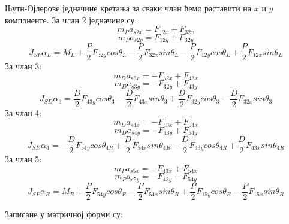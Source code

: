 \documentclass[12pt]{article}
\begin{document}
Њутн-Ојлерове једначине кретања за сваки члан ћемо раставити на $x$ и $y$ компоненте. За члан 2 једначине су:
\begin{equation}
    m_P a_{s2x} = F_{12x}+F_{32x}
\end{equation}
\begin{equation}
    m_P a_{s2y} = F_{12y}+F_{32y}
\end{equation}
\begin{equation}
    J_{SP} \alpha_L = M_L + \dfrac{P}{2}F_{32y}cos\theta_L - \dfrac{P}{2}F_{32x}sin\theta_L - \dfrac{P}{2}F_{12y}cos\theta_L + \dfrac{P}{2}F_{12x}sin\theta_L
\end{equation}
За члан 3:
\begin{equation}
    m_D a_{s3x} = -F_{32x}+F_{43x}
\end{equation}
\begin{equation}
    m_D a_{s3y} = -F_{32y}+F_{43y}
\end{equation}
\begin{equation}
    J_{SD} \alpha_3 = \dfrac{D}{2}F_{43y}cos\theta_3 - \dfrac{D}{2}F_{43x}sin\theta_3 + \dfrac{D}{2}F_{32y}cos\theta_3 - \dfrac{D}{2}F_{32x}sin\theta_3
\end{equation}
За члан 4:
\begin{equation}
    m_D a_{s4x} = -F_{43x}+F_{54x}
\end{equation}
\begin{equation}
    m_D a_{s4y} = -F_{43y}+F_{54y}
\end{equation}
\begin{equation}
    J_{SD} \alpha_4 = - \dfrac{D}{2}F_{54y}cos\theta_{4R} + \dfrac{D}{2}F_{54x}sin\theta_{4R} - \dfrac{D}{2}F_{43y}cos\theta_{4R} + \dfrac{D}{2}F_{43x}sin\theta_{4R}
\end{equation}
За члан 5:
\begin{equation}
    m_P a_{s5x} = -F_{43x}+F_{54x}
\end{equation}
\begin{equation}
    m_P a_{s5y} = -F_{43y}+F_{54y}
\end{equation}
\begin{equation}
    J_{SP} \alpha_R = M_R + \dfrac{P}{2}F_{54y}cos\theta_R - \dfrac{P}{2}F_{54x}sin\theta_R + \dfrac{P}{2}F_{15y}cos\theta_R - \dfrac{P}{2}F_{15x}sin\theta_R
\end{equation}

Записане у матричној форми су:
\end{document}
